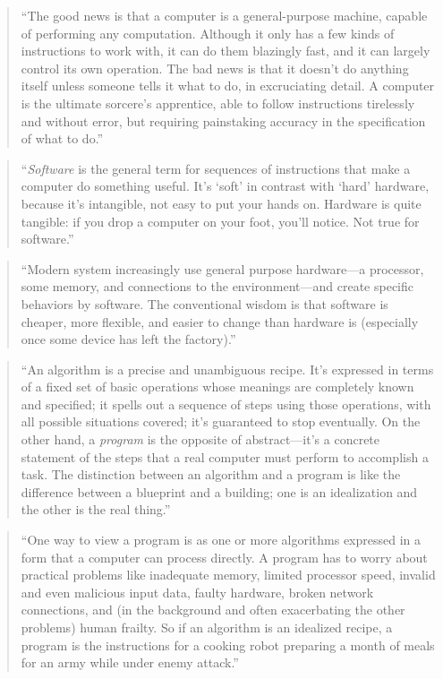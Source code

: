 \documentclass[]{tufte-book}
\begin{document}
\begin{quote}
``The good news is that a computer is a general-purpose machine, capable of performing
any computation. Although it only has a few kinds of instructions to work with, it can
do them blazingly fast, and it can largely control its own operation. The bad news is
that it doesn't do anything itself unless someone tells it what to do, in excruciating
detail. A computer is the ultimate sorcere's apprentice, able to follow instructions
tirelessly and without error, but requiring painstaking accuracy in the
specification of what to do.'' \citep{kernighan2011d}
\end{quote}

\begin{quote}
``\emph{Software} is the general term for sequences of instructions that make a computer
do something useful. It's `soft' in contrast with `hard' hardware, because it's
intangible, not easy to put your hands on. Hardware is quite tangible: if you drop
a computer on your foot, you'll notice. Not true for software.'' \citep{kernighan2011d}
\end{quote}

\begin{quote}
``Modern system increasingly use general purpose hardware---a processor, some memory,
and connections to the environment---and create specific behaviors by software. The
conventional wisdom is that software is cheaper, more flexible, and easier to change than
hardware is (especially once some device has left the factory).'' \citep{kernighan2011d}
\end{quote}

\begin{quote}
``An algorithm is a precise and unambiguous recipe. It's expressed in terms of a fixed
set of basic operations whose meanings are completely known and specified; it spells out
a sequence of steps using those operations, with all possible situations covered; it's
guaranteed to stop eventually. On the other hand, a \emph{program} is the opposite of
abstract---it's a concrete statement of the steps that a real computer must perform to
accomplish a task. The distinction between an algorithm and a program is like the difference
between a blueprint and a building; one is an idealization and the other is the real thing.''
\citep{kernighan2011d}
\end{quote}

\begin{quote}
``One way to view a program is as one or more algorithms expressed in a form that a computer
can process directly. A program has to worry about practical problems like inadequate memory,
limited processor speed, invalid and even malicious input data, faulty hardware, broken
network connections, and (in the background and often exacerbating the other problems)
human frailty. So if an algorithm is an idealized recipe, a program is the instructions for
a cooking robot preparing a month of meals for an army while under enemy attack.'' \citep{kernighan2011d}
\end{quote}
\end{document}
